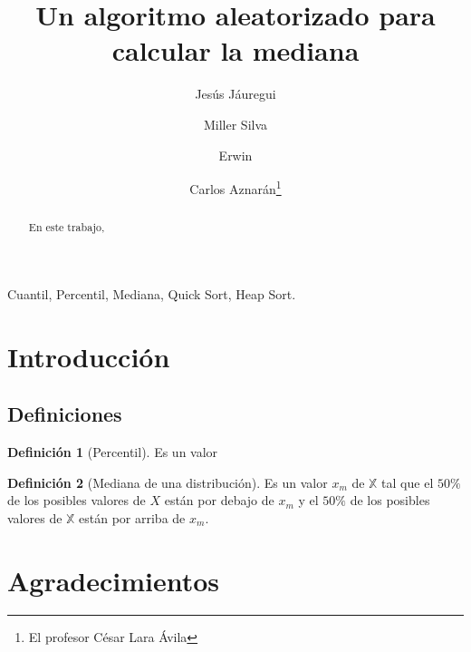 \documentclass[9pt,draft,a4paper,twoside,onecolumn,romanappendices]{IEEEtran}
\title{Un algoritmo aleatorizado para calcular la mediana}
\author{Jesús Jáuregui \and Miller Silva \and Erwin \and Carlos Aznarán\thanks{El profesor César Lara Ávila}}
\theoremstyle{definition}
\newtheorem{definition}{Definición}[subsection]
\begin{document}
\maketitle
\begin{abstract}
En este trabajo, 
\end{abstract}
\begin{IEEEkeywords}
Cuantil, Percentil, Mediana, Quick Sort, Heap Sort.
\end{IEEEkeywords}
\section{Introducción}

\subsection{Definiciones}

\begin{definition}[Percentil]
Es un valor
\end{definition}

\begin{definition}[Mediana de una distribución]
Es un valor $x_m$ de $\mathbb{X}$ tal que el $50\%$ de los posibles valores de $X$ están por debajo de $x_m$ y el $50\%$ de los posibles valores de $\mathbb{X}$ están por arriba de $x_m$.
\end{definition}

\section{Agradecimientos}
\end{document}
